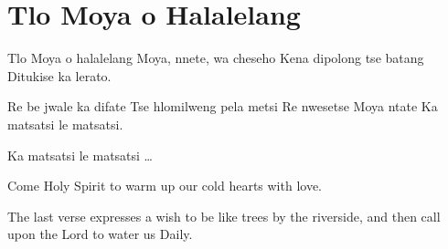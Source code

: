 \starttocol
\chapter{Tlo Moya o Halalelang}
\nexttocol
\hfill{\it }
\stoptocol
\starttocol
\startlines
{\sc Tlo} Moya o halalelang
Moya, nnete, wa cheseho
Kena dipolong tse batang
Ditukise ka lerato.

Re be jwale ka difate
Tse hlomilweng pela metsi
Re nwesetse Moya ntate
Ka matsatsi le matsatsi.

Ka matsatsi le matsatsi
\dots 

\stoplines
\nexttocol
Come Holy Spirit to warm up our cold hearts with love.

The last verse expresses a wish to be like trees by the riverside, and then call upon the Lord to water us Daily.
\stoptocol

